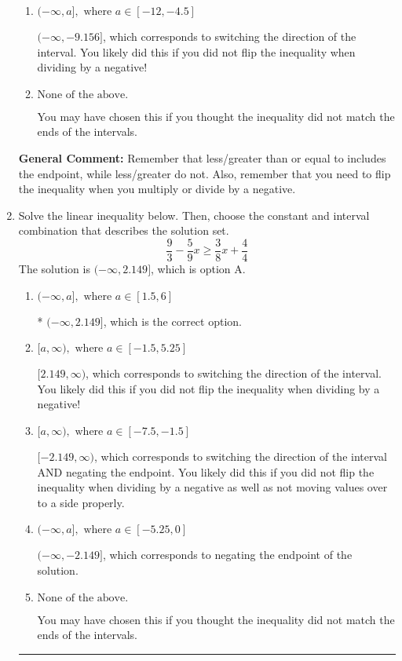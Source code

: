 \documentclass{extbook}[14pt]
\newcommand{\litem}[1]{\item #1

\rule{\textwidth}{0.4pt}}
\begin{document}
\begin{enumerate}
{\begin{enumerate}[label=\Alph*.]
* $[-9.156, \infty)$, which is the correct option.
\item \( (-\infty, a], \text{ where } a \in [-12, -4.5] \)

 $(-\infty, -9.156]$, which corresponds to switching the direction of the interval. You likely did this if you did not flip the inequality when dividing by a negative!
\item \( \text{None of the above}. \)

You may have chosen this if you thought the inequality did not match the ends of the intervals.
\end{enumerate}

\textbf{General Comment:} Remember that less/greater than or equal to includes the endpoint, while less/greater do not. Also, remember that you need to flip the inequality when you multiply or divide by a negative.
}
\litem{
Solve the linear inequality below. Then, choose the constant and interval combination that describes the solution set.
\[ \frac{9}{3} - \frac{5}{9} x \geq \frac{3}{8} x + \frac{4}{4} \]The solution is \( (-\infty, 2.149] \), which is option A.\begin{enumerate}[label=\Alph*.]
\item \( (-\infty, a], \text{ where } a \in [1.5, 6] \)

* $(-\infty, 2.149]$, which is the correct option.
\item \( [a, \infty), \text{ where } a \in [-1.5, 5.25] \)

 $[2.149, \infty)$, which corresponds to switching the direction of the interval. You likely did this if you did not flip the inequality when dividing by a negative!
\item \( [a, \infty), \text{ where } a \in [-7.5, -1.5] \)

 $[-2.149, \infty)$, which corresponds to switching the direction of the interval AND negating the endpoint. You likely did this if you did not flip the inequality when dividing by a negative as well as not moving values over to a side properly.
\item \( (-\infty, a], \text{ where } a \in [-5.25, 0] \)

 $(-\infty, -2.149]$, which corresponds to negating the endpoint of the solution.
\item \( \text{None of the above}. \)

You may have chosen this if you thought the inequality did not match the ends of the intervals.
\end{enumerate}

}
\end{enumerate}
\end{document}
